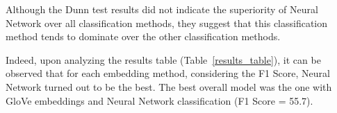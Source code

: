 

Although the Dunn test results did not indicate the superiority of Neural Network over all classification methods, they suggest that this classification method tends to dominate over the other classification methods.

Indeed, upon analyzing the results table (Table~\ref{results_table}), it can be observed that for each embedding method, considering the F1 Score, Neural Network turned out to be the best. The best overall model was the one with GloVe embeddings and Neural Network classification (F1 Score = 55.7).



